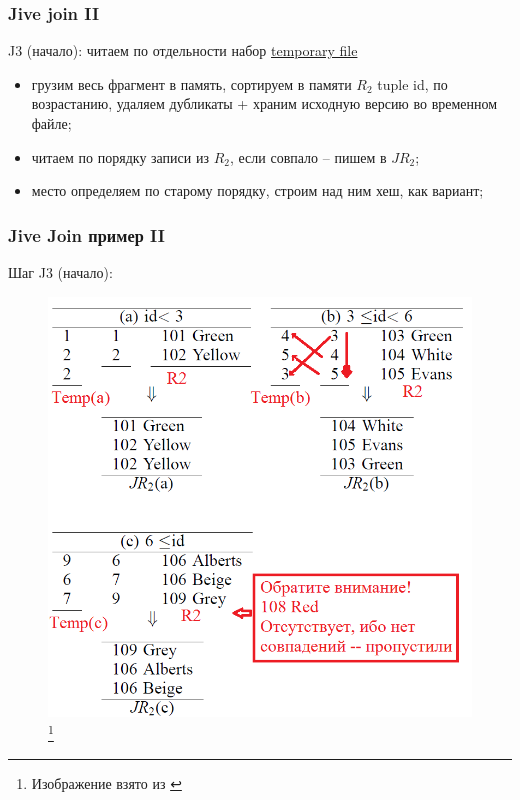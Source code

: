 \documentclass{beamer}
\begin{document}
\begin{frame}
\frametitle{Jive join II}

J3 (начало): читаем по отдельности набор \underline{temporary file}
\begin{itemize}
	\setlength\itemsep{1em}
	\item грузим весь фрагмент в память, сортируем в памяти $R_2$ tuple id, по возрастанию, удаляем дубликаты + храним исходную версию во временном файле;
	\item читаем по порядку записи из $R_2$, если совпало -- пишем в $JR_2$;
	\item место определяем по старому порядку, строим над ним хеш, как вариант;
\end{itemize}


\end{frame}


\begin{frame}
\frametitle{Jive Join пример II}

Шаг J3 (начало):

\begin{figure}[htb]
\includegraphics[width=\textwidth,height=0.75\textheight,keepaspectratio]{jive-2.png} 
\footnote{\tiny{Изображение взято из \cite{Li1999}}}
\end{figure}

\end{frame}
\end{document}
